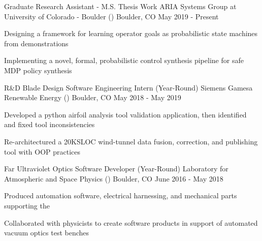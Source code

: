 \begin{cventries}
  \cventry
    {Graduate Research Assistant - M.S. Thesis Work}
    {ARIA Systems Group at University of Colorado - Boulder ()}
    {Boulder, CO}
    {May 2019 - Present}
    {
      \begin{cvitems}
        \item {Designing a framework for learning operator goals as probabilistic state machines from demonstrations}
        \item {Implementing a novel, formal, probabilistic control synthesis pipeline for safe MDP policy synthesis}
      \end{cvitems}
    }
    \cventry
    {R\&D Blade Design Software Engineering Intern (Year-Round)}
    {Siemens Gamesa Renewable Energy ()}
    {Boulder, CO}
    {May 2018 - May 2019}
    {
      \begin{cvitems}
        \item {Developed a python airfoil analysis tool validation application, then identified and fixed tool inconsistencies}
        \item {Re-architectured a 20KSLOC wind-tunnel data fusion, correction, and publishing tool with OOP practices}
      \end{cvitems}
    }

  \cventry
    {Far Ultraviolet Optics Software Developer (Year-Round)}
    {Laboratory for Atmospheric and Space Physics () }
    {Boulder, CO}
    {June 2016 - May 2018}
    {
      \begin{cvitems}
        \item {Produced automation software, electrical harnessing, and mechanical parts supporting the }
        \item {Collaborated with physicists to create software products in support of automated vacuum optics test benches}
      \end{cvitems}
    }
\end{cventries}
